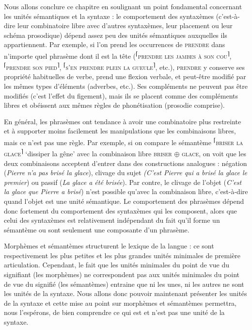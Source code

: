 Nous allons conclure ce chapitre en soulignant un point fondamental concernant les unités sémantiques et la syntaxe : le comportement des syntaxèmes (c’est-à-dire leur combinatoire libre avec d’autres syntaxèmes, leur placement ou leur schéma prosodique) dépend assez peu des unités sémantiques auxquelles ils appartiennent. Par exemple, si l’on prend les occurrences de \textsc{prendre} dans n’importe quel phrasème dont il est la tête (\textsuperscript{⌈}\textsc{prendre} \textsc{les} \textsc{jambes} \textsc{à} \textsc{son} \textsc{cou}\textsuperscript{⌉}, \textsuperscript{⌈}\textsc{prendre} \textsc{son} \textsc{pied}\textsuperscript{⌉}, \textsuperscript{⌈}\textsc{s’en} \textsc{prendre} \textsc{plein} \textsc{la} \textsc{gueule}\textsuperscript{⌉}, etc.), \textsc{prendre} y conserve ses propriété habituelles de verbe, prend une flexion verbale, et peut-être modifié par les mêmes types d’éléments (adverbes, etc.). Ses compléments ne peuvent pas être modifiés (c’est l’effet du figement), mais ils se placent comme des compléments libres et obéissent aux mêmes règles de phonétisation (prosodie comprise).

En général, les phrasèmes ont tendance à avoir une combinatoire plus restreinte et à supporter moins facilement les manipulations que les combinaisons libres, mais ce n’est pas une règle. Par exemple, si on compare le sémantème \textsuperscript{⌈}\textsc{briser} \textsc{la} \textsc{glace}\textsuperscript{⌉} ‘dissiper la gêne’ avec la combinaison libre \textsc{briser} \textsc{${\oplus}$ glace}, on voit que les deux combinaisons acceptent d’entrer dans des constructions analogues : négation (\textit{Pierre n’a pas brisé la glace}), clivage du sujet \textit{(C’est Pierre qui a brisé la glace le premier}) ou passif (\textit{La glace a été brisée}). Par contre, le clivage de l’objet (\textit{C’est la glace que Pierre a brisé}) n’est possible qu’avec la combinaison libre, c’est-à-dire quand l’objet est une unité sémantique. Le comportement des phrasèmes dépend donc fortement du comportement des syntaxèmes qui les composent, alors que celui des syntaxèmes est relativement indépendant du fait qu’il forme un sémantème ou sont seulement une composante d’un phrasème.

Morphèmes et sémantèmes structurent le lexique de la langue : ce sont respectivement les plus petites et les plus grandes unités minimales de première articulation. Cependant, le fait que les unités minimales du point de vue du signifiant (les morphèmes) ne correspondent pas aux unités minimales du point de vue du signifié (les sémantèmes) entraine que ni les unes, ni les autres ne sont les unités de la syntaxe. Nous allons donc pouvoir maintenant présenter les unités de la syntaxe et cette mise au point sur morphèmes et sémantèmes permettra, nous l’espérons, de bien comprendre ce qui est et n’est pas une unité de la syntaxe.

